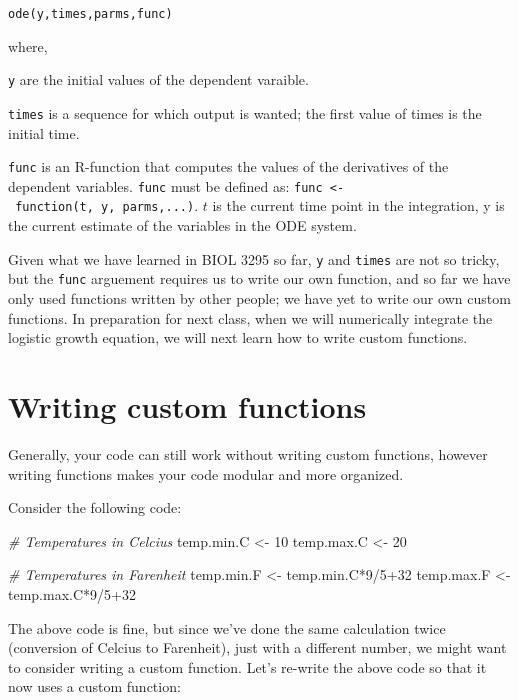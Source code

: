 \documentclass[]{book}
\newenvironment{Shaded}{\begin{snugshade}}{\end{snugshade}}
\newcommand{\DecValTok}[1]{\textcolor[rgb]{0.00,0.00,0.81}{{#1}}}
\newcommand{\StringTok}[1]{\textcolor[rgb]{0.31,0.60,0.02}{{#1}}}
\newcommand{\CommentTok}[1]{\textcolor[rgb]{0.56,0.35,0.01}{\textit{{#1}}}}
\newcommand{\NormalTok}[1]{{#1}}
\begin{document}
\texttt{ode(y,times,parms,func)}

where,

\texttt{y} are the initial values of the dependent varaible.

\texttt{times} is a sequence for which output is wanted; the first value
of times is the initial time.

\texttt{func} is an R-function that computes the values of the
derivatives of the dependent variables. \texttt{func} must be defined
as: \texttt{func\ \textless{}-\ function(t,\ y,\ parms,...)}. \(t\) is
the current time point in the integration, y is the current estimate of
the variables in the ODE system.

Given what we have learned in BIOL 3295 so far, \texttt{y} and
\texttt{times} are not so tricky, but the \texttt{func} arguement
requires us to write our own function, and so far we have only used
functions written by other people; we have yet to write our own custom
functions. In preparation for next class, when we will numerically
integrate the logistic growth equation, we will next learn how to write
custom functions.

\section{Writing custom functions}\label{writing-custom-functions}

Generally, your code can still work without writing custom functions,
however writing functions makes your code modular and more organized.

Consider the following code:

\begin{Shaded}
\begin{Highlighting}[]
\CommentTok{# Temperatures in Celcius}
\NormalTok{temp.min.C <-}\StringTok{ }\DecValTok{10}
\NormalTok{temp.max.C <-}\StringTok{ }\DecValTok{20}

\CommentTok{# Temperatures in Farenheit}
\NormalTok{temp.min.F <-}\StringTok{ }\NormalTok{temp.min.C*}\DecValTok{9}\NormalTok{/}\DecValTok{5+32}
\NormalTok{temp.max.F <-}\StringTok{ }\NormalTok{temp.max.C*}\DecValTok{9}\NormalTok{/}\DecValTok{5+32} 
\end{Highlighting}
\end{Shaded}

The above code is fine, but since we've done the same calculation twice
(conversion of Celcius to Farenheit), just with a different number, we
might want to consider writing a custom function. Let's re-write the
above code so that it now uses a custom function:
\end{document}

